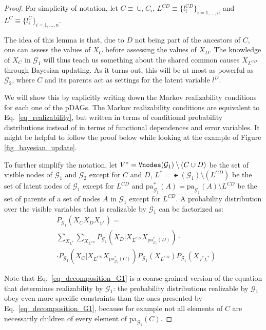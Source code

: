 \begin{proof}
    For simplicity of notation, let $C\equiv \cup_i C_i$, $L^{CD}\equiv \{l^{CD}_i\}_{i=1,...,n}$ and $L^C\equiv \{l^{C}_i\}_{i=1,...,n}$.
    
    The idea of this lemma is that, due to $D$ not being part of the ancestors of $C$, one can assess the values of $X_C$ before assessing the values of $X_D$. The knowledge of $X_C$ in $\mathcal{G}_1$ will thus teach us something about the shared common causes $X_{L^{CD}}$ through Bayesian updating. As it turns out, this will be at most as powerful as $\mathcal{G}_2$, where $C$ and its parents act as settings for the latent variable $l^D$. 

    We will show this by explicitly writing down the Markov realizability conditions for each one of the pDAGs. The Markov realizability conditions are equivalent to Eq.~\eqref{eq_realizability}, but written in terms of conditional probability distributions instead of in terms of functional dependences and error variables. It might be helpful to follow the proof below while looking at the example of Figure \ref{fig_bayesian_update}.
    
    To further simplify the notation, let $V^*=\mathtt{Vnodes}(\mathcal{G}_1)\setminus(C\cup D)$ be the set of visible nodes of $\mathcal{G}_1$ and $\mathcal{G}_2$ except for $C$ and $D$, $L^*=\lat(\mathcal{G}_1)\setminus(L^{CD})$ be the set of latent nodes of $\mathcal{G}_1$ except for $L^{CD}$ and $\text{pa}^*_{\mathcal{G}_1}(A)=\text{pa}_{\mathcal{G}_1}(A)\setminus L^{CD}$ be the set of parents of a set of nodes $A$ in $\mathcal{G}_1$ except for $L^{CD}$.    
      A probability distribution over the visible variables that is realizable by $\mathcal{G}_1$ can be factorized as:
    \begin{align}
   &P_{\mathcal{G}_1}(X_C X_D X_{V^*}) = \nonumber \\ & \sum_{X_{L^*}}\sum_{X_{L^{CD}}} P_{\mathcal{G}_1}(X_D|X_{L^{CD}}X_{\text{pa}^*_{\mathcal{G}_1}(D)}) \cdot \nonumber\\
    &\cdot P_{\mathcal{G}_1}(X_C|X_{L^{CD}}X_{\text{pa}^*_{\mathcal{G}_1}(C)})P_{\mathcal{G}_1}(X_{L^{CD}})P_{\mathcal{G}_1}(X_{V^*L^*})
    \label{eq_decomposition_G1}
    \end{align}

    Note that Eq.~\eqref{eq_decomposition_G1} is a coarse-grained version of the equation that determines realizability by $\mathcal{G}_1$: the probability distributions realizable by $\mathcal{G}_1$ obey even more specific constraints than the ones presented by Eq.~\eqref{eq_decomposition_G1}, because for example not all elements of $C$ are necessarily children of every element of $\text{pa}_{\mathcal{G}_1}(C)$.
    

\end{proof}
